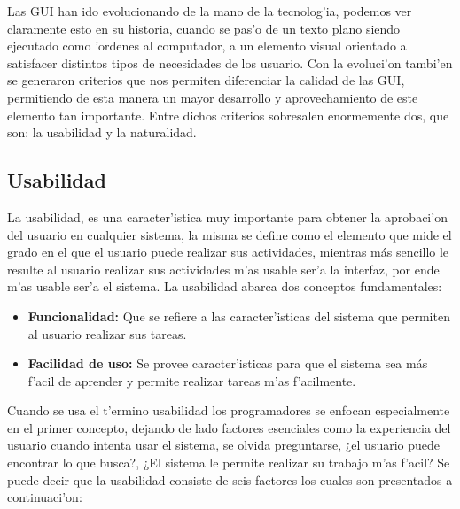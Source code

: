 \medskip
Las GUI han ido evolucionando de la mano de la tecnolog'ia, podemos ver claramente esto en su historia, cuando se pas'o de un texto plano siendo ejecutado como 'ordenes al computador, a un elemento visual orientado a satisfacer distintos tipos de necesidades de los usuario. Con la evoluci'on tambi'en se generaron criterios que nos permiten diferenciar la calidad de las GUI, permitiendo de esta manera un mayor desarrollo y aprovechamiento de este elemento tan importante.
Entre dichos criterios sobresalen enormemente dos, que son: la usabilidad  y la naturalidad.

\subsection{Usabilidad}
La usabilidad, es una caracter'istica muy importante para obtener la aprobaci'on del usuario en cualquier sistema, la misma se define como el elemento que mide el grado en el que el usuario puede realizar sus actividades, mientras más sencillo le resulte al usuario realizar sus actividades m'as usable ser'a la interfaz, por ende m'as usable ser'a el sistema. 
La usabilidad abarca dos conceptos fundamentales:

\begin{itemize}
	\item \textbf{Funcionalidad:} Que se refiere a las caracter'isticas del sistema que permiten al usuario realizar sus tareas.

	\item \textbf{Facilidad de uso:} Se provee caracter'isticas para que el sistema sea más f'acil de aprender y permite realizar tareas m'as f'acilmente.

\end{itemize}

\medskip
Cuando se usa el t'ermino usabilidad los programadores se enfocan especialmente en el primer concepto, dejando de lado factores esenciales como la experiencia del usuario cuando intenta usar el sistema, se olvida preguntarse, ¿el usuario puede encontrar lo que busca?, ¿El sistema le permite realizar su trabajo m'as f'acil?
Se puede decir que la usabilidad consiste de seis factores los cuales son presentados a continuaci'on:

